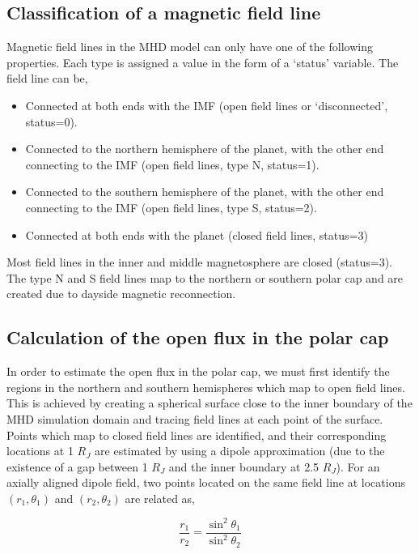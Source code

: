 \subsection{Classification of a magnetic field line}
Magnetic field lines in the MHD model can only have one of the following properties. Each type is assigned a value in the form of a `status' variable. The field line can be, 

\begin{itemize}
    \item Connected at both ends with the IMF (open field lines or `disconnected', status=0).
    \item Connected to the northern hemisphere of the planet, with the other end connecting to the IMF (open field lines, type N, status=1). 
    \item Connected to the southern hemisphere of the planet, with the other end connecting to the IMF (open field lines, type S, status=2).
    \item Connected at both ends with the planet (closed field lines, status=3)
\end{itemize}

Most field lines in the inner and middle magnetosphere are closed (status=3). The type N and S field lines map to the northern or southern polar cap and are created due to dayside magnetic reconnection.

\subsection{Calculation of the open flux in the polar cap}
In order to estimate the open flux in the polar cap, we must first identify the regions in the northern and southern hemispheres which map to open field lines. This is achieved by creating a spherical surface close to the inner boundary of the MHD simulation domain and tracing field lines at each point of the surface. Points which map to closed field lines are identified, and their corresponding locations at 1 $R_J$ are estimated by using a dipole approximation (due to the existence of a gap between 1 $R_J$ and the inner boundary at 2.5 $R_J$). For an axially aligned dipole field, two points located on the same field line at locations $(r_1, \theta_1)$ and $(r_2, \theta_2)$ are related as,

\begin{equation}
    \frac{r_1}{r_2} = \frac{\sin^2\theta_1}{\sin^2\theta_2}
\end{equation}

